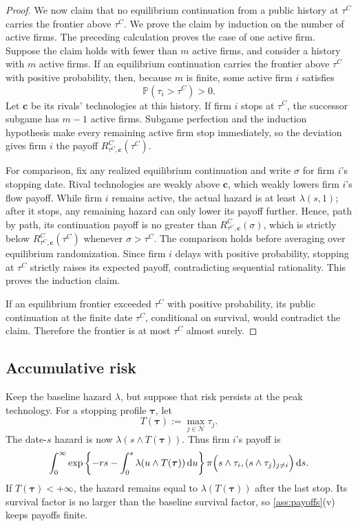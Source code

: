 \documentclass[12pt,reqno]{article}
\newcommand{\de}{\mathop{}\!\mathrm{d}}
\renewcommand{\Pr}{\mathbb{P}}
\theoremstyle{definition} \newtheorem{example}{Example}
\theoremstyle{definition} \newtheorem{condition}{Condition}
\theoremstyle{definition} \newtheorem{corollary}{Corollary}
\theoremstyle{definition} \newtheorem{claim}{Claim}
\theoremstyle{definition} \newtheorem{definition}{Definition}
\theoremstyle{definition} \newtheorem{conjecture}{Conjecture}
\theoremstyle{definition} \newtheorem{Lemma}{Lemma}
\theoremstyle{definition} \newtheorem{lemma}{Lemma}
\theoremstyle{plain} \newtheorem{theorem}{Theorem}
\theoremstyle{definition} \newtheorem{assumption}{Assumption}
\theoremstyle{definition} \newtheorem*{assumptionnonumber}{Assumption}
\theoremstyle{definition} \newtheorem*{theoremNoNumber}{Proposition}
\theoremstyle{definition}
\theoremstyle{definition}\newtheorem{proposition}{Proposition}
\theoremstyle{definition} \newtheorem{result}{Result}
\theoremstyle{definition} \newtheorem*{definitionNoNumber}{Definition}
\theoremstyle{definition} \newtheorem{Definition}{Definition}
\theoremstyle{definition} \newtheorem*{DefinitionNoNumber}{Definition}
\theoremstyle{definition} \newtheorem*{fact}{Fact}
\theoremstyle{definition} \newtheorem*{property}{Property}
\theoremstyle{definition} \newtheorem{remark}{Remark}
\begin{document}
\begin{proof}
We now claim that no equilibrium continuation from a public history at
$\tau^C$ carries the frontier above $\tau^C$. We prove the claim by induction
on the number of active firms. The preceding calculation proves the case of
one active firm. Suppose the claim holds with fewer than $m$ active firms, and
consider a history with $m$ active firms. If an equilibrium continuation
carries the frontier above $\tau^C$ with positive probability, then, because
$m$ is finite, some active firm $i$ satisfies
\[
\Pr(\tau_i>\tau^C)>0.
\]
Let $\bm c$ be its rivals' technologies at this history. If firm $i$ stops at
$\tau^C$, the successor subgame has $m-1$ active firms. Subgame perfection and
the induction hypothesis make every remaining active firm stop immediately,
so the deviation gives firm $i$ the payoff
$R^C_{\tau^C,\bm c}(\tau^C)$.

For comparison, fix any realized equilibrium continuation and write $\sigma$
for firm $i$'s stopping date. Rival technologies are weakly above $\bm c$,
which weakly lowers firm $i$'s flow payoff. While firm $i$ remains active, the
actual hazard is at least $\lambda(s,1)$; after it stops, any remaining hazard
can only lower its payoff further. Hence, path by path, its continuation payoff
is no greater than $R^C_{\tau^C,\bm c}(\sigma)$, which is strictly below
$R^C_{\tau^C,\bm c}(\tau^C)$ whenever $\sigma>\tau^C$. The comparison holds
before averaging over equilibrium randomization. Since firm $i$ delays with
positive probability, stopping at $\tau^C$ strictly raises its expected payoff,
contradicting sequential rationality. This proves the induction claim.

If an equilibrium frontier exceeded $\tau^C$ with positive probability, its
public continuation at the finite date $\tau^C$, conditional on survival,
would contradict the claim. Therefore the frontier is at most $\tau^C$ almost
surely.
\end{proof}

\subsection{Accumulative risk}\label{app:persistent-risk}

Keep the baseline hazard $\lambda$, but suppose that risk persists at the peak
technology. For a stopping profile $\bm\tau$, let
\[
T(\bm\tau):=\max_{j\in\mathcal N}\tau_j.
\]
The date-$s$ hazard is now $\lambda(s\wedge T(\bm\tau))$. Thus firm $i$'s
payoff is
\[
\int_0^\infty
\exp\left\{-rs-\int_0^s\lambda(u\wedge T(\bm\tau))\de u\right\}
\pi\Bigl(s\wedge\tau_i,(s\wedge\tau_j)_{j\neq i}\Bigr)\de s.
\]
If $T(\bm\tau)<+\infty$, the hazard remains equal to
$\lambda(T(\bm\tau))$ after the last stop. Its survival factor is no larger
than the baseline survival factor, so \cref{ass:payoffs}(v) keeps payoffs
finite.
\end{document}

